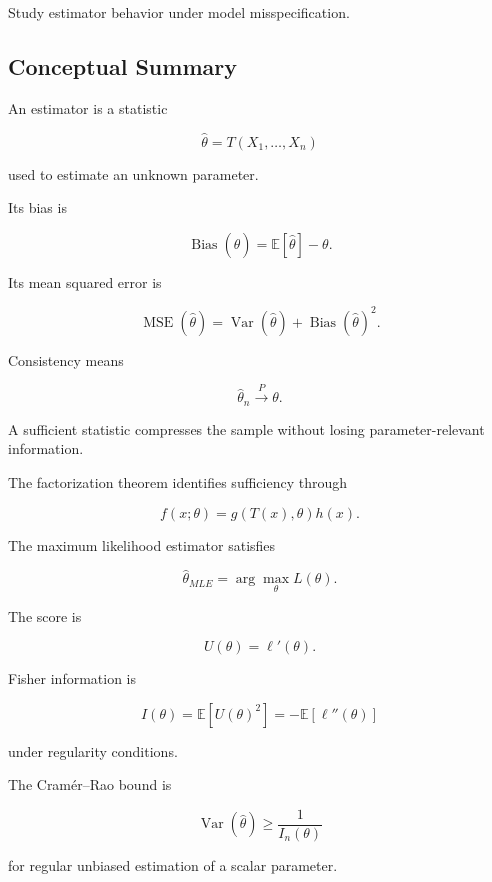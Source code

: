 \begin{exercise}[4]
Study estimator behavior under model misspecification.
\end{exercise}

\subsection{Conceptual Summary}
\label{subsec:statistical-estimation-summary}

An estimator is a statistic

\[
\boxed{
\widehat{\theta}
=
T(X_1,\ldots,X_n)
}
\]

used to estimate an unknown parameter.

Its bias is

\[
\boxed{
\operatorname{Bias}(\widehat{\theta})
=
\mathbb{E}[\widehat{\theta}]
-
\theta.
}
\]

Its mean squared error is

\[
\boxed{
\operatorname{MSE}(\widehat{\theta})
=
\operatorname{Var}(\widehat{\theta})
+
\operatorname{Bias}(\widehat{\theta})^2.
}
\]

Consistency means

\[
\boxed{
\widehat{\theta}_n
\xrightarrow{P}
\theta.
}
\]

A sufficient statistic compresses the sample without losing
parameter-relevant information.

The factorization theorem identifies sufficiency through

\[
\boxed{
f(x;\theta)
=
g(T(x),\theta)h(x).
}
\]

The maximum likelihood estimator satisfies

\[
\boxed{
\widehat{\theta}_{MLE}
=
\arg\max_{\theta}
L(\theta).
}
\]

The score is

\[
\boxed{
U(\theta)
=
\ell'(\theta).
}
\]

Fisher information is

\[
\boxed{
I(\theta)
=
\mathbb{E}[U(\theta)^2]
=
-
\mathbb{E}[\ell''(\theta)]
}
\]

under regularity conditions.

The Cram\'er--Rao bound is

\[
\boxed{
\operatorname{Var}(\widehat{\theta})
\geq
\frac1{I_n(\theta)}
}
\]

for regular unbiased estimation of a scalar parameter.

